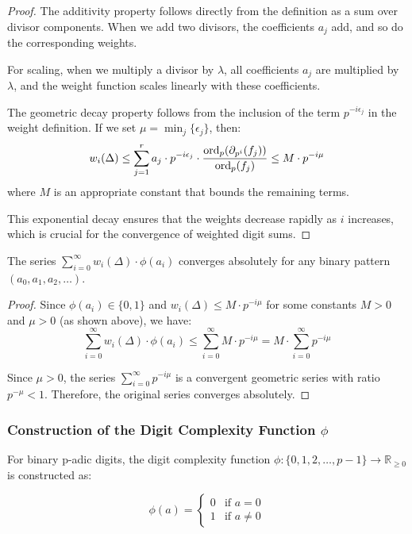 \begin{proof}
The additivity property follows directly from the definition as a sum over divisor components. When we add two divisors, the coefficients $a_j$ add, and so do the corresponding weights.

For scaling, when we multiply a divisor by $\lambda$, all coefficients $a_j$ are multiplied by $\lambda$, and the weight function scales linearly with these coefficients.

The geometric decay property follows from the inclusion of the term $p^{-i\epsilon_j}$ in the weight definition. If we set $\mu = \min_j \{\epsilon_j\}$, then:
$$w_i(\Delta) \leq \sum_{j=1}^{r} a_j \cdot p^{-i\epsilon_j} \cdot \frac{\operatorname{ord}_p(\partial_{p^i}(f_j))}{\operatorname{ord}_p(f_j)} \leq M \cdot p^{-i\mu}$$
where $M$ is an appropriate constant that bounds the remaining terms.

This exponential decay ensures that the weights decrease rapidly as $i$ increases, which is crucial for the convergence of weighted digit sums.
\end{proof}

\begin{proposition}\label{prop:weight-convergence}
The series $\sum_{i=0}^{\infty} w_i(\Delta) \cdot \phi(a_i)$ converges absolutely for any binary pattern $(a_0, a_1, a_2, \ldots)$.
\end{proposition}

\begin{proof}
Since $\phi(a_i) \in \{0, 1\}$ and $w_i(\Delta) \leq M \cdot p^{-i\mu}$ for some constants $M > 0$ and $\mu > 0$ (as shown above), we have:
$$\sum_{i=0}^{\infty} w_i(\Delta) \cdot \phi(a_i) \leq \sum_{i=0}^{\infty} M \cdot p^{-i\mu} = M \cdot \sum_{i=0}^{\infty} p^{-i\mu}$$

Since $\mu > 0$, the series $\sum_{i=0}^{\infty} p^{-i\mu}$ is a convergent geometric series with ratio $p^{-\mu} < 1$. Therefore, the original series converges absolutely.
\end{proof}

\subsubsection{Construction of the Digit Complexity Function $\phi$}

For binary p-adic digits, the digit complexity function $\phi: \{0, 1, 2, \ldots, p-1\} \to \mathbb{R}_{\geq 0}$ is constructed as:

$$\phi(a) = \begin{cases}
0 & \text{if } a = 0 \\
1 & \text{if } a \neq 0
\end{cases}$$

